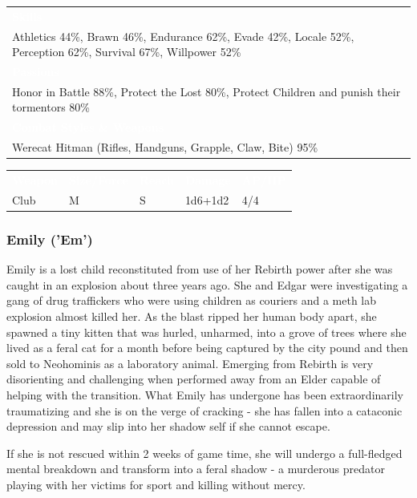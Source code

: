 \documentclass[letterpaper,serif]{rpg-module}
\begin{document}
\begin{tabularx}{\linewidth}{X}
\rowcolor{gray}
\textcolor{white}{\textbf{Skills}} \\
Athletics 44\%, Brawn 46\%, Endurance 62\%, Evade 42\%, Locale 52\%, Perception 62\%, Survival 67\%, Willpower 52\%\\
\rowcolor{gray}
\textcolor{white}{\textbf{Passions}} \\
Honor in Battle 88\%, Protect the Lost 80\%, Protect Children and punish their tormentors 80\% \\
\rowcolor{gray}
\textcolor{white}{\textbf{Combat Styles \& Weapons}} \\
Werecat Hitman (Rifles, Handguns, Grapple, Claw, Bite) 95\%
\end{tabularx}

\begin{tabularx}{\linewidth}{XXXXX}
\rowcolor{gray}
\textcolor{white}{\textbf{Weapon}} & \textcolor{white}{\textbf{Size/Force}} & \textcolor{white}{\textbf{Reach}} & \textcolor{white}{\textbf{Damage}} & \textcolor{white}{\textbf{AP/HP}} \\
Club & M & S & 1d6+1d2 & 4/4
\end{tabularx}

\subsubsection{Emily ('Em')}

Emily is a lost child reconstituted from use of her Rebirth power after she was caught in an explosion about three years ago. She and Edgar were investigating a gang of drug traffickers who were using children as couriers and a meth lab explosion almost killed her. As the blast ripped her human body apart, she spawned a tiny kitten that was hurled, unharmed, into a grove of trees where she lived as a feral cat for a month before being captured by the city pound and then sold to Neohominis as a laboratory animal. Emerging from Rebirth is very disorienting and challenging when performed away from an Elder capable of helping with the transition. What Emily has undergone has been extraordinarily traumatizing and she is on the verge of cracking - she has fallen into a cataconic depression and may slip into her shadow self if she cannot escape. 

If she is not rescued within 2 weeks of game time, she will undergo a full-fledged mental breakdown and transform into a feral shadow - a murderous predator playing with her victims for sport and killing without mercy.  
\end{document}

